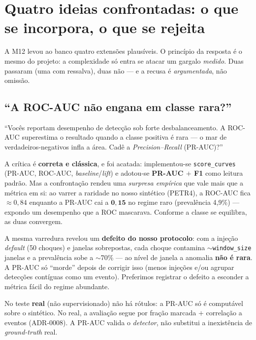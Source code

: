 \section{Quatro ideias confrontadas: o que se incorpora, o que se rejeita}
\label{sec:debate-m12}

A M12 levou ao banco quatro extensões plausíveis. O princípio da resposta é o mesmo do projeto:
a complexidade só entra se atacar um gargalo \emph{medido}. Duas passaram (uma com ressalva), duas
não --- e a recusa é \emph{argumentada}, não omissão.

\subsection{``A ROC-AUC não engana em classe rara?''}
\label{sec:debate-prauc}

\begin{confronto}
``Vocês reportam desempenho de detecção sob forte desbalanceamento. A ROC-AUC superestima o
resultado quando a classe positiva é rara --- o mar de verdadeiros-negativos infla a área. Cadê a
\emph{Precision--Recall} (PR-AUC)?''
\end{confronto}

A crítica é \textbf{correta e clássica}, e foi acatada: implementou-se \texttt{score\_curves}
(PR-AUC, ROC-AUC, \emph{baseline}/\emph{lift}) e adotou-se \textbf{PR-AUC $+$ F1} como leitura padrão.
Mas a confrontação rendeu uma \emph{surpresa empírica} que vale mais que a métrica em si: ao varrer a
raridade no nosso sintético (PETR4), a ROC-AUC fica $\approx 0{,}84$ enquanto a PR-AUC cai a
$\mathbf{0{,}15}$ no regime raro (prevalência 4,9\%) --- expondo um desempenho que a ROC mascarava.
Conforme a classe se equilibra, as duas convergem.

\begin{honesto}
A mesma varredura revelou um \textbf{defeito do nosso protocolo}: com a injeção \emph{default} (50
choques) e janelas sobrepostas, cada choque contamina ${\sim}$\texttt{window\_size} janelas e a
prevalência sobe a ${\sim}$70\% --- ao nível de janela a anomalia \textbf{não é rara}. A PR-AUC só
``morde'' depois de corrigir isso (menos injeções e/ou agrupar detecções contíguas como um evento).
Preferimos registrar o defeito a esconder a métrica fácil do regime abundante.
\end{honesto}

\begin{honesto}
No teste \textbf{real} (não supervisionado) não há rótulos: a PR-AUC só é computável sobre o
sintético. No real, a avaliação segue por fração marcada $+$ correlação a eventos (ADR-0008). A
PR-AUC valida o \emph{detector}, não substitui a inexistência de \emph{ground-truth} real.
\end{honesto}


